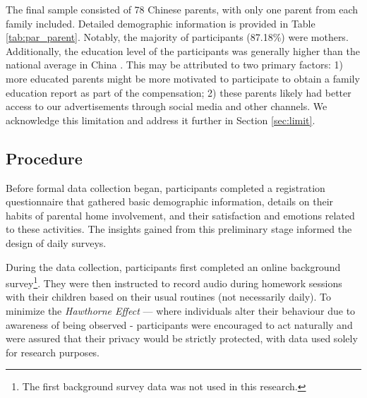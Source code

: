 The final sample consisted of 78 Chinese parents, with only one parent from each family included.  Detailed demographic information is provided in Table \ref{tab:par_parent}. Notably, the majority of participants (87.18\%) were mothers. Additionally, the education level of the participants was generally higher than the national average in China \cite{gps}. This may be attributed to two primary factors: 1) more educated parents might be more motivated to participate to obtain a family education report as part of the compensation; 2) these parents likely had better access to our advertisements through social media and other channels. %
We acknowledge this limitation and address it further in Section \ref{sec:limit}.

\subsection{Procedure}

Before formal data collection began, participants completed a registration questionnaire that gathered basic demographic information, details on their habits of parental home involvement, and their satisfaction and emotions related to these activities. The insights gained from this preliminary stage informed the design of daily surveys. 

During the data collection, participants first completed an online background survey\footnote{The first background survey data was not used in this research.}. They were then instructed to record audio during homework sessions with their children based on their usual routines (not necessarily daily). To minimize the \textit{Hawthorne Effect} \cite{adair1984hawthorne} — where individuals alter their behaviour due to awareness of being observed - participants were encouraged to act naturally and were assured that their privacy would be strictly protected, with data used solely for research purposes.


